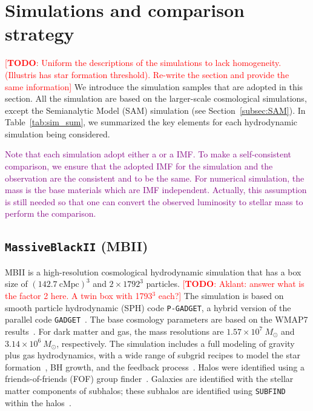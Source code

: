 \documentclass[twocolumn]{aastex631}
\newcommand{\todo}[1]{\textcolor{red}{[{\bf TODO}: #1]}}
\newcommand{\red}[1]{\textcolor{purple}{#1}}
\begin{document}
\section{Simulations and comparison strategy}
\todo{Uniform the descriptions of the simulations to lack homogeneity. (Illustris has star formation threshold). Re-write the section and provide the same information}
\label{sec:simulations}
We introduce the simulation samples that are adopted in this section. All the simulation are based on the larger-scale cosmological simulations, except the Semianalytic Model (SAM) simulation (see Section~\ref{subsec:SAM}). In Table~\ref{tab:sim_sum}, we summarized the key elements for each hydrodynamic simulation being considered.

\red{Note that each simulation adopt either a  \cite{2003PASP..115..763C} or a \cite{1955ApJ...121..161S} IMF. To make a self-consistent comparison, we ensure that the adopted IMF for the simulation and the observation are the consistent and to be the same. For numerical simulation, the mass is the base materials which are IMF independent. Actually, this assumption is still needed so that one can convert the observed luminosity to stellar mass to perform the comparison.}


\subsection{{\tt MassiveBlackII} (MBII)}\label{subsec:MBII}
MBII is a high-resolution cosmological hydrodynamic simulation that has a box size of $(142.7~\mathrm{cMpc})^3$
and $2\times1792^3$ particles. \todo{Aklant: answer what is the factor 2 here. A twin box with 1793$^3$ each?} The simulation is based on smooth particle hydrodynamic (SPH) code \texttt{P-GADGET}, a hybrid version of the parallel code {\tt GADGET}~\citep{2005MNRAS.364.1105S}. The base cosmology parameters are based on the WMAP7 results~\citep{2011ApJS..192...18K}. For dark matter and gas, the mass resolutions are $1.57\times 10^7~M_{\odot}$ and $3.14\times 10^6~M_{\odot}$, respectively. The simulation includes a full modeling of gravity plus gas hydrodynamics, with a wide range of subgrid recipes to model the star formation~\citep{2003MNRAS.339..289S}, BH growth, and the feedback process~\citep{2005Natur.433..604D}. Halos were identified using a friends-of-friends (FOF) group finder~\citep{1985ApJ...292..371D}. Galaxies are identified with the stellar matter components of subhalos; these subhalos are identified using {\tt SUBFIND} within the halos~\citep{2005MNRAS.364.1105S}.
\end{document}
